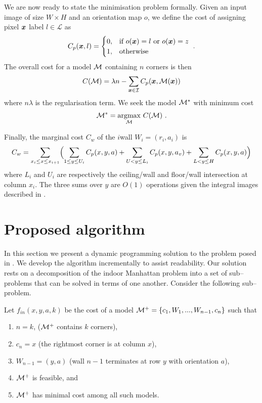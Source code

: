 We are now ready to state the minimisation problem formally. Given an
input image of size $W \times H$ and an orientation map $o$, we define
the cost of assigning pixel $\boldsymbol{x}$ label $l \in \mathcal{L}$ as
\begin{equation}
  C_p(\boldsymbol{x},l) =
  \begin{cases}
    0, & \mbox{if } o(\boldsymbol{x}) = l \mbox{ or } o(\boldsymbol{x}) = z \\
    1, & \mbox{otherwise}\\
  \end{cases}
  ~.
\end{equation}
The overall cost for a model $\mathcal{M}$ containing $n$ corners is then
\begin{equation}
  \label{eq:cost}
  C(\mathcal{M}) = \lambda n - \sum_{\boldsymbol{x}\in\mathcal{I}} C_p(\boldsymbol{x},\mathcal{M}(\boldsymbol{x}))
\end{equation}
where $n\lambda$ is the regularisation term. We seek the model
$\mathcal{M}^*$ with minimum cost
\begin{equation}
  \label{eq:opt-model}
  \mathcal{M}^* = \underset{\mathcal{M}}{\operatorname{argmax}} ~ C(\mathcal{M})
  ~.
\end{equation}

Finally, the marginal cost $C_w$ of the $i$\th wall $W_i=(r_i,a_i)$ is
\begin{equation}
  C_w = \sum_{x_i\leq x\leq x_{i+1}} \Bigl(
  \sum_{1 \leq y \leq U_i} C_p(x,y,a) +
  \sum_{U < y \leq L_i} C_p(x,y,a_v) +
  \sum_{L < y \leq H} C_p(x,y,a) \Bigr)
\end{equation}
where $L_i$ and $U_i$ are respectively the ceiling/wall and floor/wall
intersection at column $x_i$. The three sums over $y$ are $O(1)$
operations given the integral images described in
.

\section{Proposed algorithm}
In this section we present a dynamic programming solution to the
problem posed in . We develop the algorithm
incrementally to assist readability. Our solution rests on a
decomposition of the indoor Manhattan problem into a set of
sub--problems that can be solved in terms of one another. Consider the
following sub--problem.

Let $f_{in}(x,y,a,k)$ be the cost of a model $\mathcal{M}^+ =
\{c_1,W_1,...,W_{n-1},c_n\}$ such that
\begin{enumerate}
  \item{$n=k$, (\ie $\mathcal{M}^+$ contains $k$ corners),}
  \item{$c_n=x$ (\ie the rightmost corner is at column $x$),}
  \item{$W_{n-1}=(y,a)$
    (\ie wall $n-1$ terminates at row $y$ with orientation
    $a$),}
  \item{$\mathcal{M}^+$ is feasible, and}
  \item{$\mathcal{M}^+$ has minimal cost among all such models.}
\end{enumerate}

